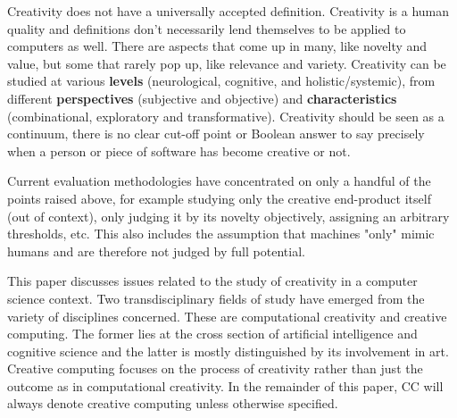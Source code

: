 Creativity does not have a universally accepted definition. Creativity is a human quality and definitions don’t necessarily lend themselves to be applied to computers as well. There are aspects that come up in many, like novelty and value, but some that rarely pop up, like relevance and variety. Creativity can be studied at various \textbf{levels} (neurological, cognitive, and holistic/systemic), from different \textbf{perspectives} (subjective and objective) and \textbf{characteristics} (combinational, exploratory and transformative). Creativity should be seen as a continuum, there is no clear cut-off point or Boolean answer to say precisely when a person or piece of software has become creative or not.

Current evaluation methodologies have concentrated on only a handful of the points raised above, for example studying only the creative end-product itself (out of context), only judging it by its novelty objectively, assigning an arbitrary thresholds, etc. This also includes the assumption that machines "only" mimic humans and are therefore not judged by full potential.

\begin{comment}
  What does it mean, how can it be measured?

  Subjectivity vs objectivity is a theme throughout

  How is it defined and measured in humans, what can we just take directly from those concepts and apply them directly to machines and what needs to be completely redefined?
\end{comment}

This paper discusses issues related to the study of creativity in a computer science context. Two transdisciplinary fields of study have emerged from the variety of disciplines concerned. These are computational creativity and creative computing. The former lies at the cross section of artificial intelligence and cognitive science and the latter is mostly distinguished by its involvement in art. Creative computing focuses on the process of creativity rather than just the outcome as in computational creativity. In the remainder of this paper, CC will always denote creative computing unless otherwise specified.

\begin{comment}
  Many of these (if not all) spawn from the computational creativity discipline.

  Introduce the difference between human and computer evaluation/creativity?
\end{comment}

